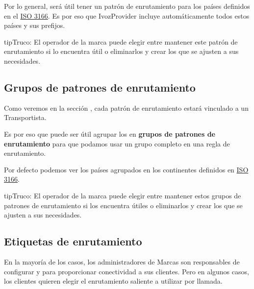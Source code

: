 \documentclass[letterpaper,10pt,spanish]{sphinxmanual}
\begin{document}
Por lo general, será útil tener un patrón de enrutamiento para los países definidos en el \href{https://en.wikipedia.org/wiki/ISO\_3166}{ISO 3166}. Es por eso que IvozProvider incluye automáticamente todos estos países y sus prefijos.

\begin{notice}{tip}{Truco:}
El operador de la marca puede elegir entre mantener este patrón de enrutamiento si lo encuentra útil o eliminarlos y crear los que se ajusten a sus necesidades.
\end{notice}


\subsection{Grupos de patrones de enrutamiento}
\label{administration_portal/brand/routing/routing_patterns_groups::doc}\label{administration_portal/brand/routing/routing_patterns_groups:routing-pattern-groups}\label{administration_portal/brand/routing/routing_patterns_groups:id1}
Como veremos en la sección {\hyperref[administration_portal/brand/routing/outgoing_routings:outgoing\string-routings]{}}, cada patrón de enrutamiento estará vinculado a un Transportista.

Es por eso que puede ser útil agrupar los {\hyperref[administration_portal/brand/routing/routing_patterns:id1]{}} en \textbf{grupos de patrones de enrutamiento} para que podamos usar un grupo completo en una regla de enrutamiento.

Por defecto podemos ver los países agrupados en los continentes definidos en \href{https://en.wikipedia.org/wiki/ISO\_3166}{ISO 3166}.

\begin{notice}{tip}{Truco:}
El operador de la marca puede elegir entre mantener estos grupos de patrones de enrutamiento si los encuentra útiles o eliminarlos y crear los que se ajusten a sus necesidades.
\end{notice}


\subsection{Etiquetas de enrutamiento}
\label{administration_portal/brand/routing/routing_tags:routing-tags}\label{administration_portal/brand/routing/routing_tags::doc}
En la mayoría de los casos, los administradores de Marcas son responsables de configurar {\hyperref[administration_portal/brand/providers/carriers:carriers]{}} y {\hyperref[administration_portal/brand/routing/outgoing_routings:outgoing\string-routings]{}} para proporcionar conectividad a sus clientes. Pero en algunos casos, los clientes quieren elegir el enrutamiento saliente a utilizar por llamada.
\end{document}
